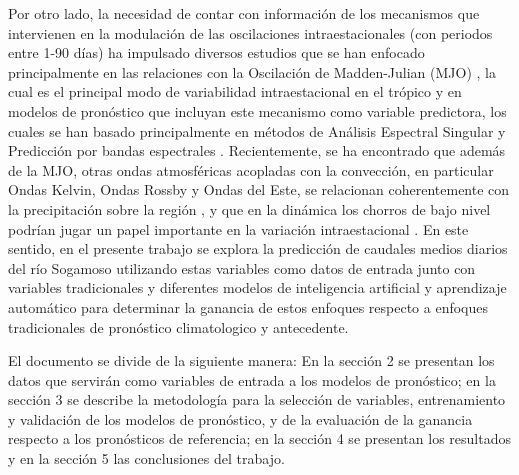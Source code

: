 \documentclass[draft]{agujournal2019}
\begin{document}
Por otro lado, la necesidad de contar con información de los mecanismos que intervienen en la modulación de las oscilaciones intraestacionales (con periodos entre 1-90 días) ha impulsado diversos estudios que se han enfocado principalmente en las relaciones con la Oscilación de Madden-Julian (MJO) \cite{Arias_2005,Poveda_and_Mesa_2000,Torres_Pineda_and_Pabon_Caicedo_2017,Grimm_2019}, la cual es el principal modo de variabilidad intraestacional en el trópico \cite{Madden_Julian_1971,Madden_Julian_1972} y en modelos de pronóstico que incluyan este mecanismo como variable predictora, los cuales se han basado principalmente en métodos de Análisis Espectral Singular y Predicción por bandas espectrales \cite{Arias_2005,Arenas_and_Carvajal_2010,Yepes_2012}. Recientemente, se ha encontrado que además de la MJO, otras ondas atmosféricas acopladas con la convección, en particular Ondas Kelvin, Ondas Rossby y Ondas del Este, se relacionan coherentemente con la precipitación sobre la región \cite{Giraldo-Cardenas_et_al_2021,Hoyos_et_al_no_published,Taborda-Soto_no_published}, y que en la dinámica los chorros de bajo nivel podrían jugar un papel importante en la variación intraestacional \cite{Arias_et_al_2021,Taborda-Soto_no_published,Serra_et_al_2010,Arias_2005}. En este sentido, en el presente trabajo se explora la predicción de caudales medios diarios del río Sogamoso utilizando estas variables como datos de entrada junto con variables tradicionales y diferentes modelos de inteligencia artificial y aprendizaje automático para determinar la ganancia de estos enfoques respecto a enfoques tradicionales de pronóstico climatologico y antecedente.

El documento se divide de la siguiente manera: En la sección 2 se presentan los datos que servirán como variables de entrada a los modelos de pronóstico; en la sección 3 se describe la metodología para la selección de variables, entrenamiento y validación de los modelos de pronóstico, y de la evaluación de la ganancia respecto a los pronósticos de referencia; en la sección 4 se presentan los resultados y en la sección 5 las conclusiones del trabajo. 



\end{document}
